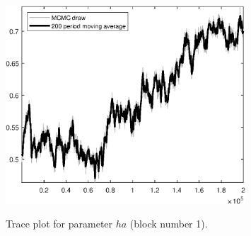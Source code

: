 \begin{figure}[H]
\centering
  \includegraphics[width=0.8\textwidth]{BRS_sectoral_rest/graphs/TracePlot_ha_blck_1}\\
    \caption{Trace plot for parameter ${ha}$ (block number 1).}
\end{figure}
